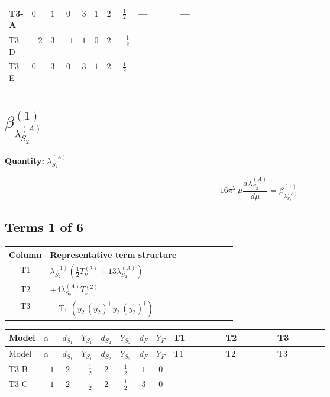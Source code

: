 \documentclass[8pt]{article}
\begin{document}
\begin{landscape}
\begin{longtable}{@{}llcccccc >{\raggedright\arraybackslash}p{0.21\linewidth} >{\raggedright\arraybackslash}p{0.21\linewidth}@{}}
\midrule
T3-A & $0$ & $1$ & $0$ & $3$ & $1$ & $2$ & $\frac{1}{2}$ & --- & --- \\
\midrule
T3-D & $-2$ & $3$ & $-1$ & $1$ & $0$ & $2$ & $-\frac{1}{2}$ & --- & --- \\
\midrule
T3-E & $0$ & $3$ & $0$ & $3$ & $1$ & $2$ & $\frac{1}{2}$ & --- & --- \\
\midrule
\bottomrule
\end{longtable}
\clearpage
\section*{$\beta_{\lambda_{S_2}^{(A)}}^{(1)}$}
\noindent\textbf{Quantity: }$\lambda_{S_2}^{(A)}$\par\smallskip
\[16\pi^2\,\mu\frac{d \lambda_{S_2}^{(A)}}{d\mu}=\beta_{\lambda_{S_2}^{(A)}}^{(1)}\]
\subsection*{Terms 1 of 6}
\begin{center}
\begin{tabular}{@{}c >{\raggedright\arraybackslash}p{0.82\linewidth}@{}}
\toprule
Column & Representative term structure \\
\midrule
T1 & \(\displaystyle {\lambda_{S_2}^{(1)}} \left(\frac{1}{2} T_{\nu}^{(2)}+13 {\lambda_{S_2}^{(A)}}\right)\) \\
\midrule
T2 & \(\displaystyle +4 {\lambda_{S_2}^{(A)}} T_{\nu}^{(2)}\) \\
\midrule
T3 & \(\displaystyle -\operatorname{Tr}\!\left({y_2}\,\left({y_2}\right)^{\dagger}\,{y_2}\,\left({y_2}\right)^{\dagger}\right)\) \\
\midrule
\bottomrule
\end{tabular}
\end{center}
\smallskip
\tiny
\begin{longtable}{@{}llcccccc >{\raggedright\arraybackslash}p{0.21\linewidth} >{\raggedright\arraybackslash}p{0.21\linewidth} >{\raggedright\arraybackslash}p{0.21\linewidth}@{}}
\toprule
Model & $\alpha$ & $d_{S_1}$ & $Y_{S_1}$ & $d_{S_2}$ & $Y_{S_2}$ & $d_F$ & $Y_F$ & T1 & T2 & T3 \\
\midrule
\endfirsthead
\toprule
Model & $\alpha$ & $d_{S_1}$ & $Y_{S_1}$ & $d_{S_2}$ & $Y_{S_2}$ & $d_F$ & $Y_F$ & T1 & T2 & T3 \\
\midrule
\endhead
T3-B & $-1$ & $2$ & $-\frac{1}{2}$ & $2$ & $\frac{1}{2}$ & $1$ & $0$ & --- & --- & --- \\
\midrule
T3-C & $-1$ & $2$ & $-\frac{1}{2}$ & $2$ & $\frac{1}{2}$ & $3$ & $0$ & --- & --- & --- \\

\end{longtable}
\end{landscape}
\end{document}
